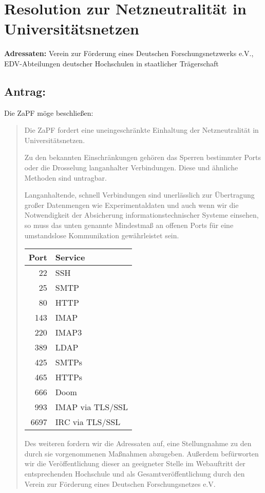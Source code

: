 \documentclass[12pt,oneside]{scrartcl}
\begin{document}
\section*{Resolution zur Netzneutralität in Universitätsnetzen}

\textbf{Adressaten:} Verein zur Förderung eines Deutschen Forschungsnetzwerks e.V., EDV-Abteilungen deutscher Hochschulen in staatlicher Trägerschaft

\subsection*{Antrag:}
Die ZaPF möge beschließen:
\begin{quote}
Die ZaPF fordert eine uneingeschränkte Einhaltung der Netzneutralität in Universitätsnetzen.

Zu den bekannten Einschränkungen gehören das Sperren bestimmter Ports oder die
Drosselung langanhalter Verbindungen. Diese und ähnliche Methoden sind
untragbar.

Langanhaltende, schnell Verbindungen sind unerlässlich zur Übertragung großer
Datenmengen wie Experimentaldaten und auch wenn wir die Notwendigkeit der
Absicherung informationstechnischer Systeme einsehen, so muss das unten genannte Mindestmaß an offenen Ports für
eine umstandslose Kommunikation gewährleistet sein.

\vspace{0.5cm}
\begin{center}
\begin{tabular}{rl}
	\toprule
	Port & Service \\
	\midrule
	22 & SSH \\
	25 & SMTP \\
	80 & HTTP \\
	143 & IMAP \\
	220 & IMAP3 \\
	389 & LDAP \\
	425 & SMTPs \\
	465 & HTTPs \\
	666 & Doom \\
	993 & IMAP via TLS/SSL \\
	6697 & IRC via TLS/SSL \\
	\bottomrule
\end{tabular}
\end{center}
\vspace{0.5cm}
Des weiteren fordern wir die Adressaten auf, eine Stellungnahme zu den durch sie vorgenommenen Maßnahmen abzugeben. Außerdem befürworten wir die Veröffentlichung dieser an geeigneter Stelle im Webauftritt der entsprechenden Hochschule und als Gesamtveröffentlichung durch den Verein zur Förderung eines Deutschen Forschungsnetzes e.V.
\end{quote}
\end{document}
